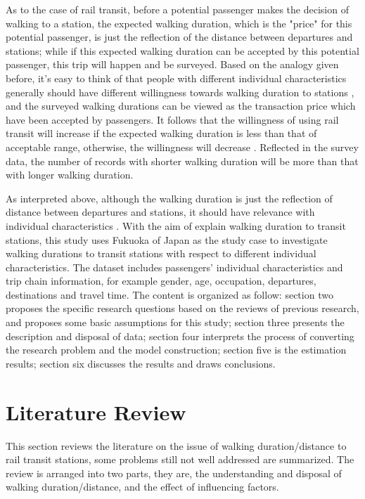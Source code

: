\documentclass[sustainability,article,submit,moreauthors,pdftex,10pt,a4paper]{Definitions/mdpi}
\begin{document}
%
As to the case of rail transit, before a potential passenger makes the decision of walking to a station, the expected walking duration, which is the "price" for this potential passenger, is just the reflection of the distance between departures and stations; while if this expected walking duration can be accepted by this potential passenger, this trip will happen and be surveyed. Based on the analogy given before, it's easy to think of that people with different individual characteristics generally should have different willingness towards walking duration to stations \cite{frank1994impacts}, and the surveyed walking durations can be viewed as the transaction price which have been accepted by passengers. It follows that the willingness of using rail transit will increase if the expected walking duration is less than that of acceptable range, otherwise, the willingness will decrease \cite{waterson2003simulating}. Reflected in the survey data, the number of records with shorter walking duration will be more than that with longer walking duration. 

%
As interpreted above, although the walking duration is just the reflection of distance between departures and stations, it should have relevance with individual characteristics \cite{besser2005walking,daniels2013explaining,guerra2012half,larsen2010beyond,yang2012walking,krygsman2004multimodal}. With the aim of explain walking duration to transit stations, this study uses Fukuoka of Japan as the study case to investigate walking durations to transit stations with respect to different individual characteristics. The dataset includes passengers' individual characteristics and trip chain information, for example gender, age, occupation, departures, destinations and travel time. The content is organized as follow: section two proposes the specific research questions based on the reviews of previous research, and proposes some basic assumptions for this study; section three presents the description and disposal of data; section four interprets the process of converting the research problem and the model construction; section five is the estimation results; section six discusses the results and draws conclusions. 
 
\section{Literature Review}
%
This section reviews the literature on the issue of walking duration/distance to rail transit stations, some problems still not well addressed are summarized. The review is arranged into two parts, they are, the understanding and disposal of walking duration/distance, and the effect of influencing factors.
\end{document}
